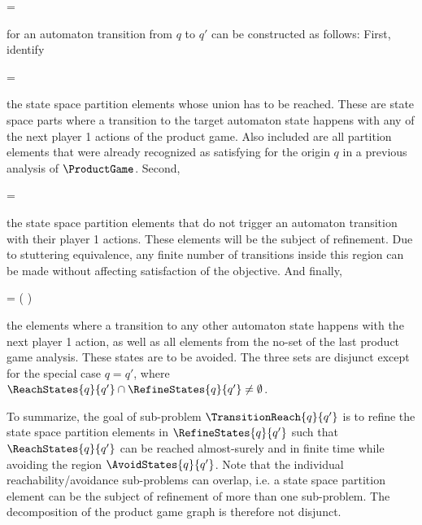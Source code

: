     \startformula
         = 
    \stopformula

    for an automaton transition from $q$ to $q'$ can be constructed as follows:
    First, identify

    \startformula
         =  \EndComma
    \stopformula

    the state space partition elements whose union has to be reached.
    These are state space parts where a transition to the target automaton state happens with any of the next player 1 actions of the product game.
    Also included are all partition elements that were already recognized as satisfying for the origin $q$ in a previous analysis of $\ProductGame$.
    Second,

    \startformula
         =  \EndComma
    \stopformula

    the state space partition elements that do not trigger an automaton transition with their player 1 actions.
    These elements will be the subject of refinement.
    Due to stuttering equivalence, any finite number of transitions inside this region can be made without affecting satisfaction of the objective.
    And finally,

    \startformula
         =  \setminus \left(  \cup {} \right) \EndComma
    \stopformula

    the elements where a transition to any other automaton state happens with the next player 1 action, as well as all elements from the no-set of the last product game analysis.
    These states are to be avoided.
    The three sets are disjunct except for the special case $q = q'$, where $\ReachStates{q}{q'} \cap \RefineStates{q}{q'} \ne \emptyset$.

    To summarize, the goal of sub-problem $\TransitionReach{q}{q'}$ is to refine the state space partition elements in $\RefineStates{q}{q'}$ such that $\ReachStates{q}{q'}$ can be reached almost-surely and in finite time while avoiding the region $\AvoidStates{q}{q'}$.
    Note that the individual reachability/avoidance sub-problems can overlap, i.e. a state space partition element can be the subject of refinement of more than one sub-problem.
    The decomposition of the product game graph is therefore not disjunct.

